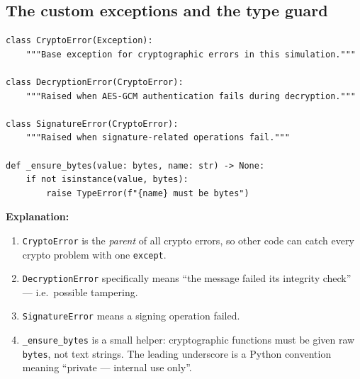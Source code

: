 \documentclass[11pt,a4paper]{article}
\begin{document}
\subsection{The custom exceptions and the type guard}
\begin{lstlisting}[style=py,caption={crypto.py --- custom exceptions and the bytes guard.}]
class CryptoError(Exception):
    """Base exception for cryptographic errors in this simulation."""

class DecryptionError(CryptoError):
    """Raised when AES-GCM authentication fails during decryption."""

class SignatureError(CryptoError):
    """Raised when signature-related operations fail."""

def _ensure_bytes(value: bytes, name: str) -> None:
    if not isinstance(value, bytes):
        raise TypeError(f"{name} must be bytes")
\end{lstlisting}
\textbf{Explanation:}
\begin{enumerate}
  \item \texttt{CryptoError} is the \emph{parent} of all crypto errors, so other
        code can catch every crypto problem with one \texttt{except}.
  \item \texttt{DecryptionError} specifically means ``the message failed its
        integrity check'' --- i.e.\ possible tampering.
  \item \texttt{SignatureError} means a signing operation failed.
  \item \texttt{\_ensure\_bytes} is a small helper: cryptographic functions must
        be given raw \texttt{bytes}, not text strings. The leading underscore is
        a Python convention meaning ``private --- internal use only''.
\end{enumerate}
\end{document}
